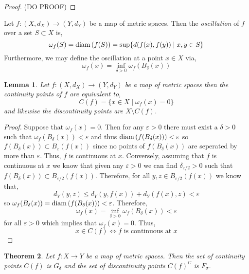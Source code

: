 \documentclass{article}
\newcommand{\ball}[2]{B_{#1} \! \left(#2 \right)}
\newenvironment{definition}[1][Definition:]{\begin{trivlist}
\item[\hskip \labelsep {\bfseries #1}]}{\end{trivlist}}
\theoremstyle{theorem}
\newtheorem{theorem}{Theorem}[section]
\newtheorem{lemma}[theorem]{Lemma}
\theoremstyle{definition}
\theoremstyle{definition}
\theoremstyle{remark}
\theoremstyle{definition}
\theoremstyle{remark}
\begin{document}
\begin{proof}
(DO PROOF)
\end{proof}

\begin{definition}
Let $f : (X, d_X) \to (Y, d_Y)$ be a map of metric spaces. Then the \textit{oscillation} of $f$ over a set $S \subset X$ is,
\[ \omega_f(S) = \mathrm{diam}\left(f(S)\right) = \sup\{d(f(x), f(y)) \mid x,y \in S \} \]
Furthermore, we may define the oscillation at a point $x \in X$ via,
\[ \omega_f(x) = \inf_{\delta > 0}\omega_f(\ball{\delta}{x}) \]
\end{definition}

\begin{lemma}
Let $f : (X, d_X) \to (Y, d_Y)$ be a map of metric spaces then the \textit{continuity points} of $f$ are equivalent to,
\[ C(f) = \{ x \in X \mid \omega_f(x) = 0 \} \]
and likewise the \textit{discontinuity points} are $X \setminus C(f)$. 
\end{lemma}

\begin{proof}
Suppose that $\omega_f(x) = 0$. Then for any $\varepsilon > 0$ there must exist a $\delta > 0$ such that $\omega_f(\ball{\delta}{x}) < \varepsilon$ and thus $\diam{f(\ball{\delta}{x})} < \varepsilon$ so $f(\ball{\delta}{x}) \subset \ball{\varepsilon}{f(x)}$ since no points of $f(\ball{\delta}{x})$ are seperated by more than $\varepsilon$. Thus, $f$ is continuous at $x$. Conversely, assuming that $f$ is continuous at $x$ we know that given any $\varepsilon > 0$ we can find $\delta_{\varepsilon/2} > 0$ such that $f(\ball{\delta}{x}) \subset \ball{\varepsilon/2}{f(x)}$. Therefore, for all $y,z \in \ball{\varepsilon/2}{f(x)}$ we know that,
\[ d_Y(y,z) \le d_Y(y, f(x)) + d_Y(f(x), z) < \varepsilon \]
so $\omega_f(\ball{\delta}{x}) = \diam{f(\ball{\delta}{x})} < \varepsilon$. Therefore, 
\[ \omega_f(x) = \inf_{\delta > 0} \omega_f(\ball{\delta}{x}) < \varepsilon\]
for all $\varepsilon > 0$ which implies that $\omega_f(x) = 0$. Thus, 
\[ x \in C(f) \iff f \text{ is continuous at } x \]  
\end{proof}

\begin{theorem}
Let $f : X \to Y$ be a map of metric spaces. Then the set of continuity points $C(f)$ is $G_{\delta}$ and the set of discontinuity points $C(f)^C$ is $F_{\sigma}$. 
\end{theorem}
\end{document}
